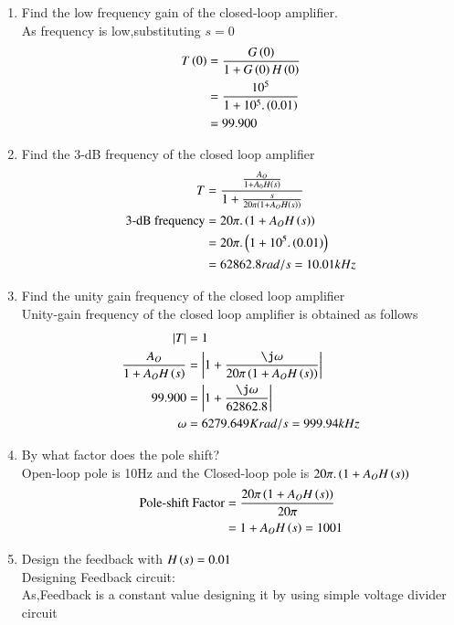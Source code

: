 \begin{enumerate}[label=\thesubsection.\arabic*.,ref=\thesubsection.\theenumi]
\item Find the low frequency gain of the closed-loop amplifier.\\ 
\solution As frequency is low,substituting $s=0$\\
\begin{align}
    T\left(0\right)&=\frac{G\left(0\right)}{1+G\left(0\right)H\left(0\right)}\\
    &=\frac{10^5}{1+10^5.\left(0.01\right)}\\
    &=99.900
\end{align}

\item Find the 3-dB frequency of the closed loop amplifier\\
\solution
\begin{align}
    T&=\frac{\frac{A_{O}}{1+A_{0}H\left(s\right)}}{1+\frac{s}{20\pi\left(1+A_{O}H\left(s\right)\right)}}\\
    \text{3-dB frequency}&=20\pi.\left(1+A_{O}H\left(s\right)\right)\\
    &=20\pi.\left(1+10^5.\left(0.01\right)\right)\\
    &=62862.8rad/s=10.01kHz
\end{align}

\item Find the unity gain frequency of the closed loop amplifier\\
\solution Unity-gain frequency of the closed loop amplifier is obtained as follows
\begin{align}
    \abs{T}&=1\\
    \frac{A_{O}}{1+A_{O}H\brak{s}}&=\abs{1+\frac{\j\omega}{20\pi\brak{1+A_{O}H\brak{s}}}}\\
    99.900&=\abs{1+\frac{\j\omega}{62862.8}}\\
    \omega&=6279.649Krad/s=999.94kHz
\end{align}


\item By what factor does the pole shift?\\
\solution Open-loop pole is 10Hz and the Closed-loop pole is $20\pi.\left(1+A_{O}H\left(s\right)\right)$\\
\begin{align}
    \text{Pole-shift Factor}&=\frac{20\pi\left(1+A_{O}H\left(s\right)\right)}{20\pi}\\
    &=1+A_{O}H\left(s\right)=1001
\end{align}



\item Design the feedback with $H\left(s\right)=0.01$\\
\solution Designing Feedback circuit:\\
As,Feedback is a constant value designing it by using simple voltage divider circuit
\begin{figure}[!ht]
    \begin{center}
		\resizebox{\columnwidth}{!}{}
	\end{center}
\caption{}
\label{fig:ee18btech11035_feedback}
\end{figure}


\end{enumerate}

